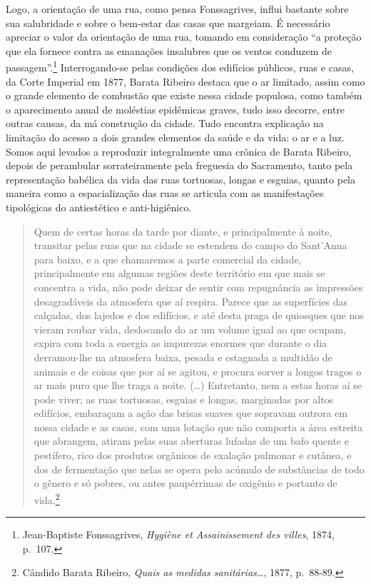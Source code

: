 Logo, a orientação de uma rua, como pensa Fonssagrives, influi bastante
sobre sua salubridade e sobre o bem-estar das casas que margeiam. É
necessário apreciar o valor da orientação de uma rua, tomando em
consideração ``a proteção que ela fornece contra as emanações insalubres
que os ventos conduzem de passagem''.\footnote{Jean-Baptiste
  Fonssagrives, \emph{Hygiène et Assainissement des villes}, 1874,
  p.~107.} Interrogando-se pelas condições dos edifícios públicos, ruas
e casas, da Corte Imperial em 1877, Barata Ribeiro destaca que o ar
limitado, assim como o grande elemento de combustão que existe nessa
cidade populosa, como também o aparecimento anual de moléstias
epidêmicas graves, tudo isso decorre, entre outras causas, da má
construção da cidade. Tudo encontra explicação na limitação do acesso a
dois grandes elementos da saúde e da vida: o ar e a luz. Somos aqui
levados a reproduzir integralmente uma crônica de Barata Ribeiro, depois
de perambular sorrateiramente pela freguesia do Sacramento, tanto pela
representação babélica da vida das ruas tortuosas, longas e esguias,
quanto pela maneira como a espacialização das ruas se articula com as
manifestações tipológicas do antiestético e anti-higiênico.

\begin{quote}
Quem de certas horas da tarde por diante, e principalmente à noite,
transitar pelas ruas que na cidade se estendem do campo do Sant'Anna
para baixo, e a que chamaremos a parte comercial da cidade,
principalmente em algumas regiões deste território em que mais se
concentra a vida, não pode deixar de sentir com repugnância as
impressões desagradáveis da atmosfera que aí respira. Parece que as
superfícies das calçadas, dos lajedos e dos edifícios, e até desta praga
de quiosques que nos vieram roubar vida, deslocando do ar um volume
igual ao que ocupam, expira com toda a energia as impurezas enormes que
durante o dia derramou-lhe na atmosfera baixa, pesada e estagnada a
multidão de animais e de coisas que por aí se agitou, e procura sorver a
longos tragos o ar mais puro que lhe traga a noite. (\ldots{})
Entretanto, nem a estas horas aí se pode viver; as ruas tortuosas,
esguias e longas, marginadas por altos edifícios, embaraçam a ação das
brisas suaves que sopravam outrora em nossa cidade e as casas, com uma
lotação que não comporta a área estreita que abrangem, atiram pelas suas
aberturas lufadas de um bafo quente e pestífero, rico dos produtos
orgânicos de exalação pulmonar e cutânea, e dos de fermentação que nelas
se opera pelo acúmulo de substâncias de todo o gênero e só pobres, ou
antes paupérrimas de oxigênio e portanto de vida.\footnote{Cândido
  Barata Ribeiro, \emph{Quais as medidas sanitárias\ldots{}}, 1877,
  p.~88-89.}
\end{quote}

